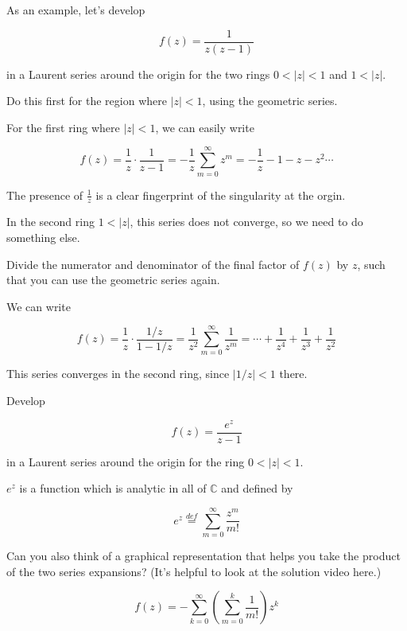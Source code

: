 
As an example, let's develop

$$f(z)=\frac{1}{z(z-1)}$$

in a Laurent series around the origin for the two rings $0 < | z | < 1$ and $ 1 < |z|$.

\begin{cue}
Do this first for the region where  $| z | < 1$, using the geometric series.
\end{cue}

For the first ring where $| z | < 1$, we can easily write

$$f(z)=\frac{1}{z} \cdot \frac{1}{z-1} = -\frac{1}{z} \sum_{m=0}^{\infty} z^m =-\frac{1}{z}-1-z-z^2 \cdots$$

The presence of $\frac{1}{z}$ is a clear fingerprint of the singularity at the orgin.

In the second ring  $ 1 < |z|$, this series does not converge, so we need to do something else.

\begin{cue}
Divide the numerator and denominator of the final factor of $f(z)$ by $z$, such that you can use the geometric series again.
\end{cue}

We can write

$$f(z)=\frac{1}{z} \cdot \frac{1 / z }{1-1/z} = \frac{1}{z^2} \sum_{m=0}^{\infty} \frac{1}{z^m} =\cdots+\frac{1}{z^4}+\frac{1}{z^3} + \frac{1}{z^2}$$

This series converges in the second ring, since $|1/z| < 1$ there.

\pagebreak

\begin{exer}
\label{ex_laurent_1}
Develop

$$f(z)=\frac{e^z}{z-1}$$

in a Laurent series around the origin for the ring $0 < | z | < 1$.

$e^z$ is a function which is analytic in all of $\mathbb{C}$ and defined by

$$e^z \stackrel{def}{=} \sum_{m=0}^{\infty} \frac{z^m}{m!} $$

Can you also think of a graphical representation that helps you take the product of the two series expansions? (It's helpful to look at the solution video here.)

\begin{sol}
$$f(z)= - \sum_{k=0}^{\infty} \left(\sum _{m=0}^k \frac{1}{m!} \right) z^k $$
\end{sol}

\end{exer}

